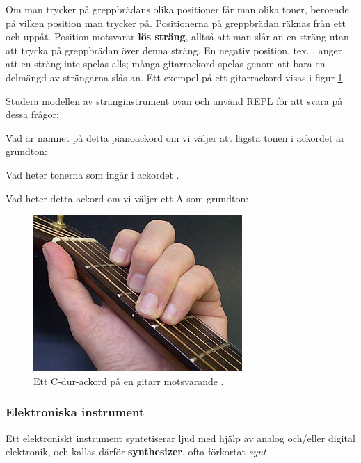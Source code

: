 {

Om man trycker på greppbrädans olika positioner får man olika toner, beroende på vilken position man trycker på. Positionerna på greppbrädan räknas från ett och uppåt. Position  motsvarar \textbf{lös sträng}, alltså att man slår an en sträng utan att trycka på greppbrädan över denna sträng. En negativ position, tex. , anger att en sträng inte spelas alls; många gitarrackord spelas genom att bara en delmängd av strängarna slås an.
Ett exempel på ett gitarrackord  visas i figur \ref{music:fig:guitar-chord}.

\Task\Pen Studera modellen av stränginstrument ovan och använd REPL för att svara på dessa frågor:

\Subtask Vad är namnet på detta pianoackord om vi väljer att lägsta tonen i ackordet är grundton: 

\Subtask Vad heter tonerna som ingår i ackordet .

\Subtask Vad heter detta ackord om vi väljer ett A som grundton: 


\begin{figure}
  \centering
  \includegraphics{../img/chords/guitar-C-major-chord.jpg}
  \caption{Ett C-dur-ackord på en gitarr motsvarande .}
  \label{music:fig:guitar-chord}
\end{figure}


\subsubsection{Elektroniska instrument}

Ett elektroniskt instrument syntetiserar ljud med hjälp av analog och/eller digital elektronik, och kallas därför \textbf{synthesizer}, ofta förkortat \emph{synt} .

}
